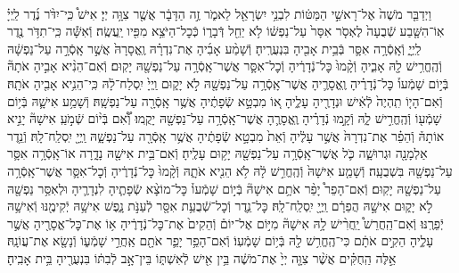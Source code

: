 \documentclass[twoside, openany, parskip=half, 11pt]{book}
\begin{document}
\begin{sometimes}
\begin{footnotesize}
\begin{multicols}{2}
\\
וַיְדַבֵּ֤ר מֹשֶׁה֙ אֶל־רָאשֵׁ֣י הַמַּטּ֔וֹת לִבְנֵ֥י יִשְׂרָאֵ֖ל לֵאמֹ֑ר זֶ֣ה הַדָּבָ֔ר אֲשֶׁ֖ר צִוָּ֥ה יְיָ׃ אִישׁ֩ כִּֽי־יִדֹּ֨ר נֶ֜דֶר לַֽיְיָ֗ אֽוֹ־הִשָּׁ֤בַע שְֿׁבֻעָה֙ לֶאְסֹ֤ר אִסָּר֙ עַל־נַפְשׁ֔וֹ לֹ֥א יַחֵ֖ל דְּֿבָר֑וֹ כְּֿכׇל־הַיֹּצֵ֥א מִפִּ֖יו יַֽעֲשֶֽׂה׃ וְֿאִשָּׁ֕ה כִּֽי־תִדֹּ֥ר נֶ֖דֶר לַֽיְיָ֑ וְֿאָֽסְֿרָ֥ה אִסָּ֛ר בְּֿבֵ֥ית אָבִ֖יהָ בִּנְעֻרֶֽיהָ׃ וְֿשָׁמַ֨ע אָבִ֜יהָ אֶת־נִדְרָ֗הּ וֶֽאֱסָרָהּ֙ אֲשֶׁ֣ר אָֽסְֿרָ֣ה עַל־נַפְשָׁ֔הּ וְֿהֶֽחֱרִ֥ישׁ לָ֖הּ אָבִ֑יהָ וְֿקָ֨מוּ֙ כׇּל־נְֿדָרֶ֔יהָ וְֿכׇל־אִסָּ֛ר אֲשֶׁר־אָֽסְֿרָ֥ה עַל־נַפְשָׁ֖הּ יָקֽוּם׃ וְֿאִם־הֵנִ֨יא אָבִ֣יהָ אֹתָהּ֘ בְּֿי֣וֹם שָׁמְֿעוֹ֒ כׇּל־נְֿדָרֶ֗יהָ וֶֽאֱסָרֶ֛יהָ אֲשֶׁר־אָֽסְֿרָ֥ה עַל־נַפְשָׁ֖הּ לֹ֣א יָק֑וּם וַֽיְיָ֙ יִֽסְלַח־לָ֔הּ כִּֽי־הֵנִ֥יא אָבִ֖יהָ אֹתָֽהּ׃ וְֿאִם־הָי֤וֹ תִֽהְיֶה֙ לְֿאִ֔ישׁ וּנְדָרֶ֖יהָ עָלֶ֑יהָ א֚וֹ מִבְטָ֣א שְֿׂפָתֶ֔יהָ אֲשֶׁ֥ר אָֽסְֿרָ֖ה עַל־נַפְשָֽׁהּ׃ וְֿשָׁמַ֥ע אִישָׁ֛הּ בְּֿי֥וֹם שָׁמְֿע֖וֹ וְֿהֶֽחֱרִ֣ישׁ לָ֑הּ וְֿקָ֣מוּ נְֿדָרֶ֗יהָ וֶֽאֱסָרֶ֛הָ אֲשֶׁר־אָֽסְֿרָ֥ה עַל־נַפְשָׁ֖הּ יָקֻֽמוּ׃ וְֿ֠אִ֠ם בְּֿי֨וֹם שְֿׁמֹ֣עַֽ אִישָׁהּ֘ יָנִ֣יא אוֹתָהּ֒ וְֿהֵפֵ֗ר אֶת־נִדְרָהּ֙ אֲשֶׁ֣ר עָלֶ֔יהָ וְֿאֵת֙ מִבְטָ֣א שְֿׂפָתֶ֔יהָ אֲשֶׁ֥ר אָֽסְֿרָ֖ה עַל־נַפְשָׁ֑הּ וַֽיְיָ֖ יִֽסְלַֽח־לָֽהּ׃  וְֿנֵ֥דֶר אַלְמָנָ֖ה וּגְרוּשָׁ֑ה כֹּ֛ל אֲשֶׁר־אָֽסְֿרָ֥ה עַל־נַפְשָׁ֖הּ יָק֥וּם עָלֶֽיהָ׃ וְֿאִם־בֵּ֥ית אִישָׁ֖הּ נָדָ֑רָה אוֹ־אָֽסְֿרָ֥ה אִסָּ֛ר עַל־נַפְשָׁ֖הּ בִּשְׁבֻעָֽה׃ וְֿשָׁמַ֤ע אִישָׁהּ֙ וְֿהֶֽחֱרִ֣שׁ לָ֔הּ לֹ֥א הֵנִ֖יא אֹתָ֑הּ וְֿקָ֨מוּ֙ כׇּל־נְֿדָרֶ֔יהָ וְֿכׇל־אִסָּ֛ר אֲשֶׁר־אָֽסְֿרָ֥ה עַל־נַפְשָׁ֖הּ יָקֽוּם׃ וְֿאִם־הָפֵר֩ יָפֵ֨ר אֹתָ֥ם אִישָׁהּ֘ בְּֿי֣וֹם שָׁמְֿעוֹ֒ כׇּל־מוֹצָ֨א שְֿׂפָתֶ֧יהָ לִנְדָרֶ֛יהָ וּלְאִסַּ֥ר נַפְשָׁ֖הּ לֹ֣א יָק֑וּם אִישָׁ֣הּ הֲפֵרָ֔ם וַֽיְיָ֖ יִֽסְלַֽח־לָֽהּ׃  כׇּל־נֵ֛דֶר וְֿכׇל־שְֿׁבֻעַ֥ת אִסָּ֖ר לְֿעַנֹּ֣ת נָ֑פֶשׁ אִישָׁ֥הּ יְֿקִימֶ֖נּוּ וְֿאִישָׁ֥הּ יְֿפֵרֶֽנּוּ׃ וְֿאִם־הַֽחֲרֵשׁ֩ יַֽחֲרִ֨ישׁ לָ֥הּ אִישָׁהּ֘ מִיּ֣וֹם אֶל־יוֹם֒ וְֿהֵקִים֙ אֶת־כׇּל־נְֿדָרֶ֔יהָ א֥וֹ אֶת־כׇּל־אֱסָרֶ֖יהָ אֲשֶׁ֣ר עָלֶ֑יהָ הֵקִ֣ים אֹתָ֔ם כִּי־הֶֽחֱרִ֥שׁ לָ֖הּ בְּֿי֥וֹם שָׁמְֿעֽוֹ׃ וְֿאִם־הָפֵ֥ר יָפֵ֛ר אֹתָ֖ם אַֽחֲרֵ֣י שָׁמְֿע֑וֹ וְֿנָשָׂ֖א אֶת־עֲוֹנָֽהּ׃ אֵ֣לֶּה הַֽחֻקִּ֗ים אֲשֶׁ֨ר צִוָּ֤ה יְיָ֙ אֶת־מֹשֶׁ֔ה בֵּ֥ין אִ֖ישׁ לְֿאִשְׁתּ֑וֹ בֵּין־אָ֣ב לְֿבִתּ֔וֹ בִּנְעֻרֶ֖יהָ בֵּ֥ית אָבִֽיהָ׃


\end{multicols}
\end{footnotesize}
\end{sometimes}
\end{document}
